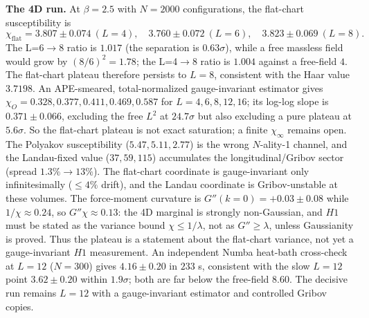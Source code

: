 \textbf{The 4D run.} At $\beta=2.5$ with $N=2000$ configurations, the flat-chart susceptibility is
\begin{equation}
  \chi_{\mathrm{flat}}=3.807\pm0.074\ (L=4),\quad
  3.760\pm0.072\ (L=6),\quad
  3.823\pm0.069\ (L=8).
  \label{eq:v3m1plateau}
\end{equation}
The L=6$\to$8 ratio is $1.017$ (the separation is $0.63\sigma$), while a free massless field would
grow by $(8/6)^2=1.78$; the L=4$\to$8 ratio is $1.004$ against a free-field $4$. The flat-chart
plateau therefore persists to $L=8$, consistent with the Haar value $3.7198$. An APE-smeared,
total-normalized gauge-invariant estimator gives $\chi_O=0.328,0.377,0.411,0.469,0.587$ for
$L=4,6,8,12,16$; its log-log slope is $0.371\pm0.066$, excluding the free $L^2$ at $24.7\sigma$ but
also excluding a pure plateau at $5.6\sigma$. So the flat-chart plateau is not exact saturation; a
finite $\chi_\infty$ remains open. The Polyakov susceptibility ($5.47,5.11,2.77$) is the wrong
$N$-ality-1 channel, and the Landau-fixed value ($37,59,115$) accumulates the longitudinal/Gribov
sector (spread $1.3\%\to13\%$). The flat-chart coordinate is gauge-invariant only infinitesimally
($\le4\%$ drift), and the Landau coordinate is Gribov-unstable at these volumes. The force-moment
curvature is $G''(k=0)=+0.03\pm0.08$ while $1/\chi\approx0.24$, so $G''\chi\approx0.13$: the 4D
marginal is strongly non-Gaussian, and $H1$ must be stated as the variance bound
$\chi\le1/\lambda$, not as $G''\ge\lambda$, unless Gaussianity is proved. Thus the plateau is a
statement about the flat-chart variance, not yet a gauge-invariant $H1$ measurement. An independent
Numba heat-bath cross-check at $L=12$ ($N=300$) gives $4.16\pm0.20$ in $233$ s, consistent with the
slow $L=12$ point $3.62\pm0.20$ within $1.9\sigma$; both are far below the free-field $8.60$. The
decisive run remains $L=12$ with a gauge-invariant estimator and controlled Gribov copies.

